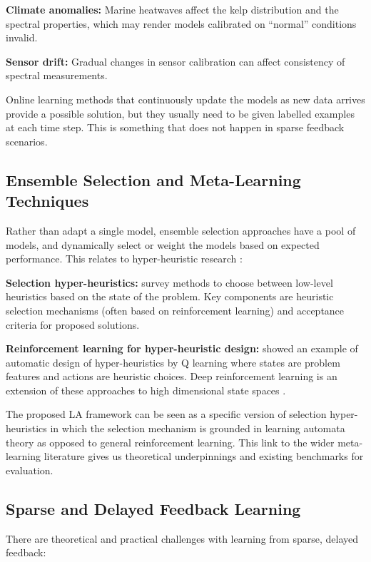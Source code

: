 \documentclass[12pt,oneside]{book}
\begin{document}
\textbf{Climate anomalies:} Marine heatwaves affect the kelp distribution and the spectral properties, which may render models calibrated on ``normal'' conditions invalid.

\textbf{Sensor drift:} Gradual changes in sensor calibration can affect consistency of spectral measurements.

Online learning methods that continuously update the models as new data arrives provide a possible solution, but they usually need to be given labelled examples at each time step. This is something that does not happen in sparse feedback scenarios.

\subsection{Ensemble Selection and Meta-Learning Techniques}
\label{subsec:ensemble-selection}

Rather than adapt a single model, ensemble selection approaches have a pool of models, and dynamically select or weight the models based on expected performance. This relates to hyper-heuristic research \citep{Ganaie2022}:

\textbf{Selection hyper-heuristics:} \citet{Drake2020} survey methods to choose between low-level heuristics based on the state of the problem. Key components are heuristic selection mechanisms (often based on reinforcement learning) and acceptance criteria for proposed solutions.

\textbf{Reinforcement learning for hyper-heuristic design:} \citet{Choong2018} showed an example of automatic design of hyper-heuristics by Q learning where states are problem features and actions are heuristic choices. Deep reinforcement learning is an extension of these approaches to high dimensional state spaces \citep{SuttonBarto2018, Lapeyrolerie2022}.

The proposed LA framework can be seen as a specific version of selection hyper-heuristics in which the selection mechanism is grounded in learning automata theory as opposed to general reinforcement learning. This link to the wider meta-learning literature gives us theoretical underpinnings and existing benchmarks for evaluation.

\subsection{Sparse and Delayed Feedback Learning}
\label{subsec:sparse-feedback}

There are theoretical and practical challenges with learning from sparse, delayed feedback:
\end{document}
